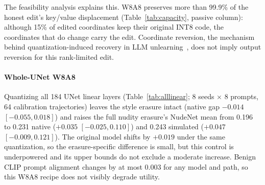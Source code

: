 \documentclass[conference]{IEEEtran}
\begin{document}
The feasibility analysis explains this. W8A8 preserves more than 99.9\% of the
honest edit's key/value displacement (Table~\ref{tab:capacity}, passive column):
although 15\% of edited coordinates keep their original INT8 code, the
coordinates that do change carry the edit. Coordinate reversion, the mechanism behind
quantization-induced recovery in LLM unlearning~\cite{zhang2025}, does not
imply output reversion for this rank-limited edit.

\paragraph{Whole-UNet W8A8}
Quantizing all 184 UNet linear layers (Table~\ref{tab:alllinear}; 8 seeds $\times$
8 prompts, 64 calibration trajectories) leaves the style erasure intact (native gap
$-0.014$ $[-0.055,0.018]$) and raises the full nudity erasure's NudeNet mean from
0.196 to 0.231 native ($+0.035$ $[-0.025,0.110]$) and 0.243 simulated ($+0.047$
$[-0.009,0.121]$). The original model shifts by $+0.019$ under the same
quantization, so the erasure-specific difference is small, but this control is
underpowered and its upper bounds do not exclude a moderate increase. Benign CLIP
prompt alignment changes by at most 0.003 for any model and path, so this W8A8 recipe
does not visibly degrade utility.

\begin{table}[t]
\centering
\caption{Whole-UNet W8A8 control (all 184 linear layers; 64 images per cell). Gaps
are path minus FP16 with paired crossed 95\% intervals.}
\label{tab:alllinear}
\end{table}
\end{document}
